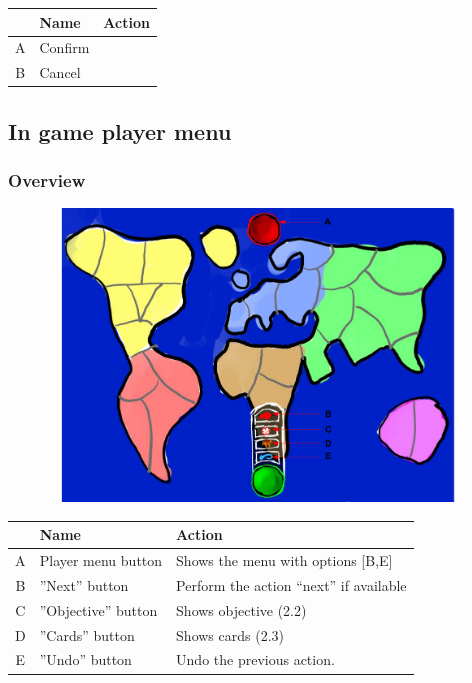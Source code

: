 \documentclass[12pt,a4paper]{article}
\begin{document}
\begin{table}[H]
\small
\centering
\begin{tabular}{c|p{5cm}|p{7cm}}
& Name & Action \\ \hline\hline
A
&Confirm
\\B
&Cancel
\end{tabular}
\end{table}

\subsection{In game player menu}

\subsubsection{Overview}

\begin{figure}[H]
  \centering
  \includegraphics[width=11cm]{pic/mocks/2-1.pdf}
\end{figure}

\begin{table}[H]
\small
\centering
\begin{tabular}{c|p{5cm}|p{7cm}}
& Name & Action \\ \hline\hline
A
&Player menu button
&Shows the menu with options [B,E]
\\B
&''Next'' button
&Perform the action “next” if available
\\C
&''Objective'' button
&Shows objective (2.2)
\\D
&''Cards'' button
&Shows cards (2.3)
\\E
&''Undo'' button
&Undo the previous action.
\end{tabular}
\end{table}
\end{document}
